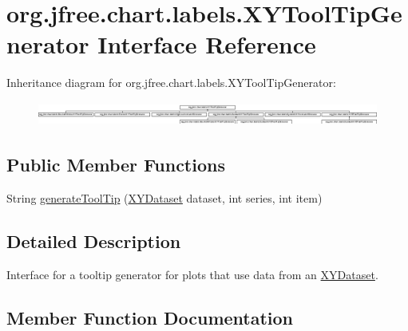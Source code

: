 \hypertarget{interfaceorg_1_1jfree_1_1chart_1_1labels_1_1_x_y_tool_tip_generator}{}\section{org.\+jfree.\+chart.\+labels.\+X\+Y\+Tool\+Tip\+Generator Interface Reference}
\label{interfaceorg_1_1jfree_1_1chart_1_1labels_1_1_x_y_tool_tip_generator}
Inheritance diagram for org.\+jfree.\+chart.\+labels.\+X\+Y\+Tool\+Tip\+Generator\+:\begin{figure}[H]
\begin{center}
\leavevmode
\includegraphics[height=0.804598cm]{interfaceorg_1_1jfree_1_1chart_1_1labels_1_1_x_y_tool_tip_generator}
\end{center}
\end{figure}
\subsection*{Public Member Functions}
\begin{DoxyCompactItemize}
\item 
String \mbox{\hyperlink{interfaceorg_1_1jfree_1_1chart_1_1labels_1_1_x_y_tool_tip_generator_a310de5269e50370adaa416bf897c24c5}{generate\+Tool\+Tip}} (\mbox{\hyperlink{interfaceorg_1_1jfree_1_1data_1_1xy_1_1_x_y_dataset}{X\+Y\+Dataset}} dataset, int series, int item)
\end{DoxyCompactItemize}


\subsection{Detailed Description}
Interface for a tooltip generator for plots that use data from an \mbox{\hyperlink{}{X\+Y\+Dataset}}. 

\subsection{Member Function Documentation}
\mbox{\label{interfaceorg_1_1jfree_1_1chart_1_1labels_1_1_x_y_tool_tip_generator_a310de5269e50370adaa416bf897c24c5}} 
